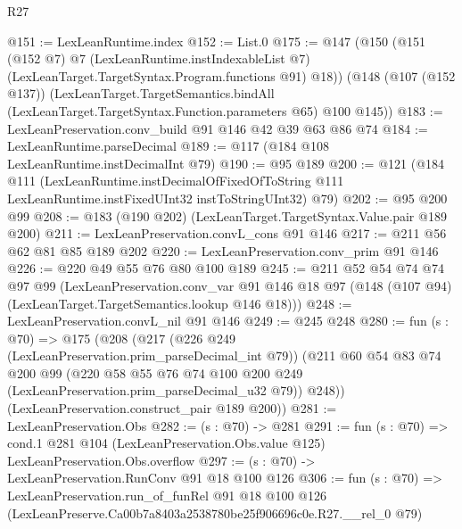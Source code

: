 \begin{lexlean}{R27}
\begin{coremodule}
@151 := LexLeanRuntime.index
@152 := List.{0}
@175 := @147
    (@150
      (@151
        (@152 @7)
        @7
        (LexLeanRuntime.instIndexableList @7)
        (LexLeanTarget.TargetSyntax.Program.functions @91)
        @18))
    (@148
      (@107 (@152 @137))
      (LexLeanTarget.TargetSemantics.bindAll
        (LexLeanTarget.TargetSyntax.Function.parameters @65)
        @100
        @145))
@183 := LexLeanPreservation.conv_build @91 @146 @42 @39 @63 @86 @74
@184 := LexLeanRuntime.parseDecimal
@189 := @117 (@184 @108 LexLeanRuntime.instDecimalInt @79)
@190 := @95 @189
@200 := @121
    (@184
      @111
      (LexLeanRuntime.instDecimalOfFixedOfToString
        @111
        LexLeanRuntime.instFixedUInt32
        instToStringUInt32)
      @79)
@202 := @95 @200 @99
@208 := @183 (@190 @202) (LexLeanTarget.TargetSyntax.Value.pair @189 @200)
@211 := LexLeanPreservation.convL_cons @91 @146
@217 := @211 @56 @62 @81 @85 @189 @202
@220 := LexLeanPreservation.conv_prim @91 @146
@226 := @220 @49 @55 @76 @80 @100 @189
@245 := @211
    @52
    @54
    @74
    @74
    @97
    @99
    (LexLeanPreservation.conv_var
      @91
      @146
      @18
      @97
      (@148 (@107 @94) (LexLeanTarget.TargetSemantics.lookup @146 @18)))
@248 := LexLeanPreservation.convL_nil @91 @146
@249 := @245 @248
@280 := fun (s : @70) =>
  @175
    (@208
      (@217
        (@226 @249 (LexLeanPreservation.prim_parseDecimal_int @79))
        (@211
          @60
          @54
          @83
          @74
          @200
          @99
          (@220 @58 @55 @76 @74 @100 @200 @249 (LexLeanPreservation.prim_parseDecimal_u32 @79))
          @248))
      (LexLeanPreservation.construct_pair @189 @200))
@281 := LexLeanPreservation.Obs
@282 := (s : @70) -> @281
@291 := fun (s : @70) =>
  cond.{1} @281 @104 (LexLeanPreservation.Obs.value @125) LexLeanPreservation.Obs.overflow
@297 := (s : @70) -> LexLeanPreservation.RunConv @91 @18 @100 @126
@306 := fun (s : @70) =>
  LexLeanPreservation.run_of_funRel
    @91
    @18
    @100
    @126
    (LexLeanPreserve.Ca00b7a8403a2538780be25f906696c0e.R27.__rel_0 @79)
\end{coremodule}
\end{lexlean}
